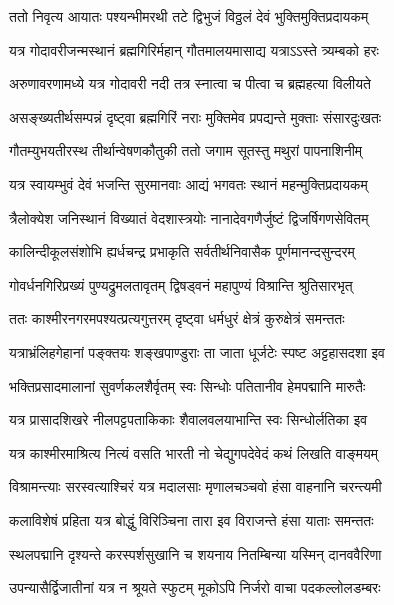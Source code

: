 \twolineshloka
{ततो निवृत्य आयातः पश्यन्भीमरथी तटे}
{द्विभुजं विठ्ठलं देवं भुक्तिमुक्तिप्रदायकम्} %

\twolineshloka
{यत्र गोदावरीजन्मस्थानं ब्रह्मगिरिर्महान्}
{गौतमालयमासाद्य यत्राऽऽस्ते त्र्यम्बको हरः} %

\twolineshloka
{अरुणावरणामध्ये यत्र गोदावरी नदी}
{तत्र स्नात्वा च पीत्वा च ब्रह्महत्या विलीयते} %

\twolineshloka
{असङ्ख्यतीर्थसम्पन्नं दृष्ट्वा ब्रह्मगिरिं नराः}
{मुक्तिमेव प्रपद्यन्ते मुक्ताः संसारदुःखतः} %

\twolineshloka
{गौतम्युभयतीरस्थ तीर्थान्वेषणकौतुकी}
{ततो जगाम सूतस्तु मथुरां पापनाशिनीम्} %

\twolineshloka
{यत्र स्वायम्भुवं देवं भजन्ति सुरमानवाः}
{आद्यं भगवतः स्थानं महन्मुक्तिप्रदायकम्} %

\twolineshloka
{त्रैलोक्येश जनिस्थानं विख्यातं वेदशास्त्रयोः}
{नानादेवगणैर्जुष्टं द्विजर्षिगणसेवितम्} %

\twolineshloka
{कालिन्दीकूलसंशोभि ह्यर्धचन्द्र प्रभाकृति}
{सर्वतीर्थनिवासैक पूर्णमानन्दसुन्दरम्} %

\twolineshloka
{गोवर्धनगिरिप्रख्यं पुण्यद्रुमलतावृतम्}
{द्विषड्वनं महापुण्यं विश्रान्ति श्रुतिसारभृत्} %

\twolineshloka
{ततः काश्मीरनगरमपश्यत्प्रत्यगुत्तरम्}
{दृष्ट्वा धर्मधुरं क्षेत्रं कुरुक्षेत्रं समन्ततः} %

\twolineshloka
{यत्राभ्रंलिहगेहानां पङ्क्तयः शङ्खपाण्डुराः}
{ता जाता धूर्जटेः स्पष्ट अट्टहासदशा इव} %

\twolineshloka
{भक्तिप्रसादमालानां सुवर्णकलशैर्वृतम्}
{स्वः सिन्धोः पतितानीव हेमपद्मानि मारुतैः} %

\twolineshloka
{यत्र प्रासादशिखरे नीलपट्टपताकिकाः}
{शैवालवलयाभान्ति स्वः सिन्धोर्लतिका इव} %

\twolineshloka
{यत्र काश्मीरमाश्रित्य नित्यं वसति भारती}
{नो चेद्युगपदेवेदं कथं लिखति वाङ्मयम्} %

\twolineshloka
{विश्रामन्त्याः सरस्वत्याश्चिरं यत्र मदालसाः}
{मृणालचञ्चवो हंसा वाहनानि चरन्त्यमी} %

\twolineshloka
{कलाविशेषं प्रहिता यत्र बोद्धुं विरिञ्चिना}
{तारा इव विराजन्ते हंसा याताः समन्ततः} %

\twolineshloka
{स्थलपद्मानि दृश्यन्ते करस्पर्शसुखानि च}
{शयनाय नितम्बिन्या यस्मिन् दानववैरिणा} %

\twolineshloka
{उपन्यासैर्द्विजातीनां यत्र न श्रूयते स्फुटम्}
{मूकोऽपि निर्जरो वाचा पदकल्लोलडम्बरः} %

